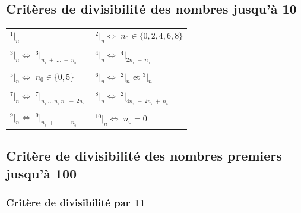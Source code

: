 \documentclass[a4paper, twoside]{article}
\begin{document}
	\subsection{Critères de divisibilité des nombres jusqu'à 10}
		
		\bigskip
		
		{\huge{\parindent=0mm
		\begin{tabular}{l||l}
			
			$^1|_n$ &
			$^2|_n \Leftrightarrow$ {\Large $n_0 \in \{ 0,2,4,6,8 \}$} \\
			
		\tabularnewline

			$^3|_n \Leftrightarrow$ $^3|_{n_{_k}~+~\ldots~+~n_{_0}}$ &
			$^4|_n \Leftrightarrow$ $^4|_{2 n_{_1}~+~n_{_0}}$ \\
		
		\tabularnewline

			$^5|_n \Leftrightarrow$ {\Large $n_0 \in \{ 0,5 \}$} &
			$^6|_n \Leftrightarrow$ $^2|_n$ {\Large et} $^3|_n$ \\
		
		\tabularnewline	
			
			$^7|_n \Leftrightarrow$ $^7|_{ \overline{n_{_k}~\dots~n_{_2}~n_{_1}} ~-~2 n_{_0}}~$ & 
			$^8|_n \Leftrightarrow$ $^2|_{4n_{_2}~+~2n_{_1}~+~n_{_0}}$ \\
		
		\tabularnewline	
		
			$^9|_n \Leftrightarrow$ $^9|_{n_{_k}~+~\ldots~+~n_{_0}}$ &
			$^{10}|_n \Leftrightarrow$ {\Large $n_0 = 0$} \\

		\end{tabular}
		
		}}
		
	\let\thefootnote\relax{}


	\bigskip

	\newpage

	\subsection{Critère de divisibilité des nombres premiers jusqu'à 100}

	\subsubsection*{Critère de divisibilité par 11}
\end{document}

